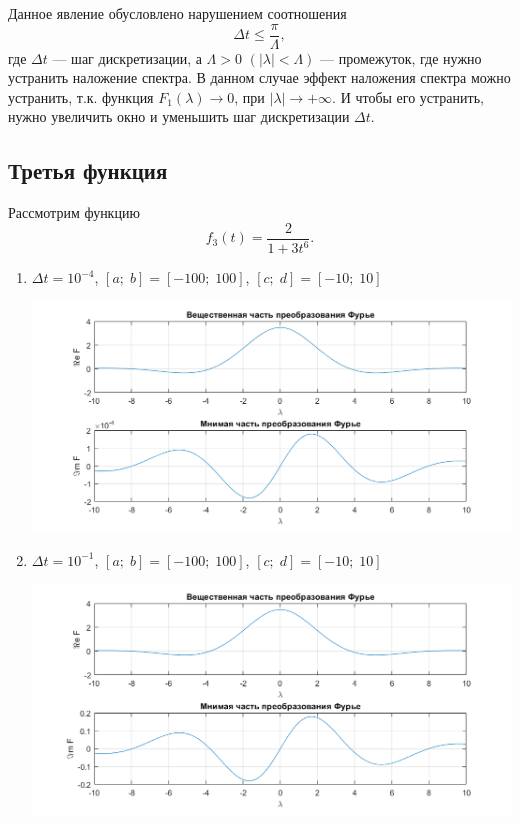 \documentclass[a4paper, 11pt]{article}
\begin{document}
\begin{enumerate}
\begin{enumerate}
                        Данное явление обусловлено нарушением соотношения $$\Delta t \leq \frac{\pi} {\Lambda},$$ где $\Delta t$ — шаг дискретизации, а $\Lambda > 0$ $(|\lambda| < \Lambda)$ — промежуток, где нужно устранить наложение спектра. В данном случае эффект наложения спектра можно устранить, т.к. функция $F_1(\lambda) \longrightarrow 0$, при $|\lambda|\longrightarrow +\infty$. И чтобы его устранить, нужно увеличить окно и уменьшить шаг дискретизации $\Delta t$.
                \end{enumerate}
        \end{enumerate}
    \subsection{Третья функция}
        Рассмотрим функцию        
        $$
            f_3(t)=\frac{2}{1+3t^6}.
        $$
        \begin{enumerate}
            \item
                $\Delta t = 10^{-4}$, $[a;\; b] = [-100;\; 100]$, $[c;\;d] = [-10;\;10]$
                
                \includegraphics[width=\linewidth]{img/7.png}
            \item
                $\Delta t = 10^{-1}$, $[a;\; b] = [-100;\; 100]$, $[c;\;d] = [-10;\;10]$
                
                \includegraphics[width=\linewidth]{img/8.png}
        \end{enumerate}
        
\end{document}
